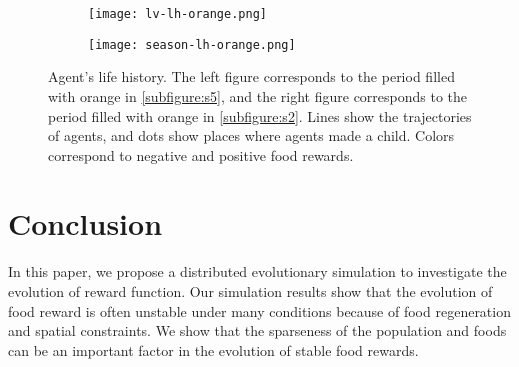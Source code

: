 \begin{figure}[t]
  \begin{subfigure}[t]{7cm}
    \centering
    \texttt{[image: lv-lh-orange.png]}
    \label{subfigure:lvlh}
  \end{subfigure}
  \begin{subfigure}[t]{7cm}
    \centering
    \texttt{[image: season-lh-orange.png]}
    \label{subfigure:seasonlh}
  \end{subfigure}
  \caption{
    Agent's life history. The left figure corresponds to the period filled with orange in \cref{subfigure:s5}, and the right figure corresponds to the period filled with orange in \cref{subfigure:s2}. Lines show the trajectories of agents, and dots show places where agents made a child. Colors correspond to negative and positive food rewards.
  }\label{figure:s5-lh}
\end{figure}

\section{Conclusion}
In this paper, we propose a distributed evolutionary simulation to investigate the evolution of reward function. Our simulation results show that the evolution of food reward is often unstable under many conditions because of food regeneration and spatial constraints. We show that the sparseness of the population and foods can be an important factor in the evolution of stable food rewards.